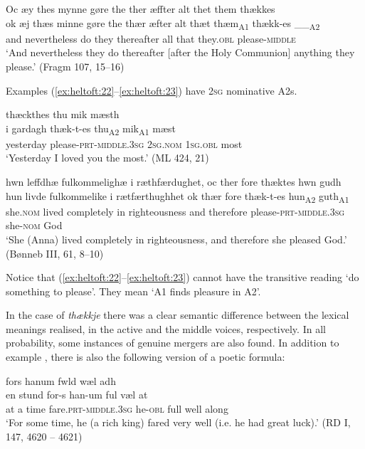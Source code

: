 \documentclass[output=paper]{langscibook}
\begin{document}
\begin{exe}
\ex \label{ex:heltoft:21}
    \glll Oc {æy thes mynne} gøre the {ther æffter} alt thet them thækkes\\
        ok   {æj thæs minne} gøre the    {thær æfter} alt thæt   thæm\textsubscript{A1} {thækk-es \_\_}\textsubscript{A2}\\
        and nevertheless   do they  thereafter  all that    they.\textsc{obl}  please-\textsc{middle}\\
    \glt ‘And nevertheless they do thereafter [after the Holy Communion] anything they please.' (Fragm 107, 15--16)
\end{exe}


Examples (\ref{ex:heltoft:22}--\ref{ex:heltoft:23}) have 2\textsc{sg} nominative A2s.

\ea    \label{ex:heltoft:22}
     thæckthes thu mik mæsth\\
         {i gardagh}  thæk-t-es          thu\textsubscript{A2}   mik\textsubscript{A1}    mæst\\
         yesterday  please-\textsc{prt-middle.3sg}  \textsc{2sg}\textsc{.nom}  \textsc{1sg.obl} most\\
    \glt ‘Yesterday I loved you the most.' (ML 424, 21)   

\ex \label{ex:heltoft:23}
    \glll hwn leffdhæ fulkommelighæ i ræthfærdughet, oc {ther fore} thæktes hwn gudh\\
        hun    livde  fulkommelike   i rætfærthughhet     ok {thær fore} thæk-t-es            hun\textsubscript{A2}    guth\textsubscript{A1}\\
        she.\textsc{nom}   lived  completely     in righteousness    and therefore please-\textsc{prt-middle.3sg}    she-\textsc{nom}  God\\
    \glt ‘She (Anna) lived completely in righteousness, and therefore she pleased God.' (Bønneb III, 61, 8--10)
\z

Notice that (\ref{ex:heltoft:22}--\ref{ex:heltoft:23}) cannot have the transitive reading ‘do something to please'. They mean ‘A1 finds pleasure in A2'.

In the case of \textit{thækkje} there was a clear semantic difference between the lexical meanings realised, in the active and the middle voices, respectively. In all probability, some instances of genuine mergers are also found. In addition to example , there is also the following version of a poetic formula:

\begin{exe}
\ex    \label{ex:heltoft:24}
     fors hanum fwld wæl adh\\
       {en  stund}  for-s          han-um    ful    væl   at \\ 
       {at a time}   fare.\textsc{prt-middle.3sg}  he-\textsc{obl}    full    well  along \\
    \glt ‘For some time, he (a rich king) fared very well (i.e. he had great luck).' (RD I, 147, 4620 – 4621)
\end{exe} 
\end{document}
